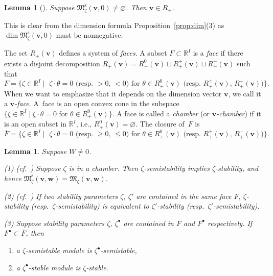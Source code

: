 \documentclass[pdftex]{sigma}
\newenvironment{aenume}{%
  \begin{enumerate}%
  \renewcommand{\theenumi}{\alph{enumi}}%
  \renewcommand{\labelenumi}{\textup{(\theenumi)}}%
  }{\end{enumerate}}
\newtheorem{Lemma}[equation]{Lemma}
\theoremstyle{definition}
\numberwithin{equation}{section}
\newcommand{\propref}[1]{Proposition~\ref{#1}}
\newcommand{\R}{{\mathbb R}}
\newcommand{\M}{{\mathfrak M}} %
\newcommand{\Mreg}{\M^{\operatorname{s}}}
\newcommand{\bv}{{\mathbf v}} %
\newcommand{\bw}{{\mathbf w}} %
\begin{document}
\begin{Lemma}[]\label{lem:nondeg}
  Suppose $\Mreg_\zeta(\bv,0)\neq\varnothing$. Then $\bv \in R_+$.
\end{Lemma}

This is clear from the dimension formula \propref{prop:dim}(3) as
$\dim \Mreg_\zeta(\bv,0)$ must be nonnegative.

The set $R_+(\bv)$ def\/ines a system of {\it faces\/}. A subset
$F\subset \R^I$ is a {\it face\/} if there exists a disjoint
decomposition $R_+(\bv) = R_+^0(\bv) \sqcup R_+^+(\bv) \sqcup
R_+^-(\bv)$ such that
\begin{equation*}
    F = \{ \zeta\in \R^I \mid \text{
     $\zeta\cdot \theta = 0$ (resp.\ $> 0$, $< 0$) for
    $\theta\in R_+^0(\bv)$ (resp.\ $R_+^+(\bv)$, $R_+^-(\bv)$)}\}.
\end{equation*}
%
When we want to emphasize that it depends on the dimension vector
$\bv$, we call it a {\it $\bv$-face}.
%
A~face is an open convex cone in the subspace $\{ \zeta\in\R^I \mid
\text{$\zeta\cdot\theta = 0$ for $\theta\in R_+^0(\bv)$}\}$. A face is
called a {\it chamber\/} (or {\it $\bv$-chamber\/}) if it is an open
subset in $\R^I$, i.e., $R_+^0(\bv) = \varnothing$. The closure of~$F$
is
\begin{equation*}
    \overline{F} = \{ \zeta\in \R^I \mid \text{
     $\zeta\cdot \theta = 0$ (resp.\ $\ge 0$, $\le 0$) for
    $\theta\in R_+^0(\bv)$ (resp.\ $R_+^+(\bv)$, $R_+^-(\bv)$)}\}.
\end{equation*}

\begin{Lemma}\label{lem:face}
  Suppose $W\neq 0$.

  \textup{(1) (cf.\ \cite[2.8]{Na-quiver})} Suppose $\zeta$ is in a
  chamber. Then $\zeta$-semistability implies $\zeta$-stability, and hence
  $\Mreg_\zeta(\bv,\bw) = \M_\zeta(\bv,\bw)$.

  \textup{(2) (cf.\ \cite[1.4]{Na-ADHM})} If two stability parameters
  $\zeta$, $\zeta'$ are contained in the same face $F$,
  $\zeta$-stability \textup(resp.\ $\zeta$-semistability\textup) is
  equivalent to $\zeta'$-stability \textup(resp.\
  $\zeta'$-semistability\textup).

  \textup{(3)} Suppose stability parameters $\zeta$, $\zeta^\bullet$ are
  contained in $F$ and $F^\bullet$ respectively. If $F^\bullet\subset
  \overline{F}$, then
  \begin{aenume}\itemsep=0pt
    \item a $\zeta$-semistable module is $\zeta^\bullet$-semistable,
    \item a $\zeta^\bullet$-stable module is $\zeta$-stable.
  \end{aenume}
\end{Lemma}
\end{document}
